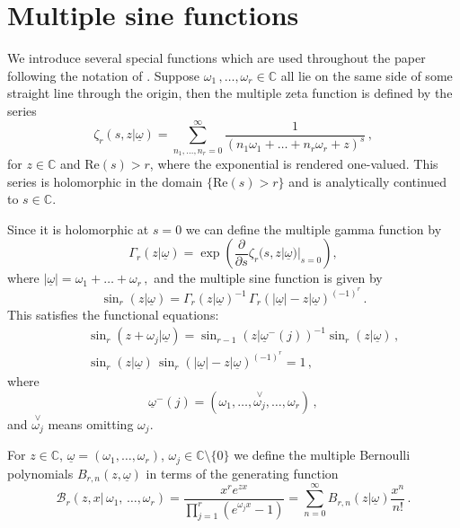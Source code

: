 \documentclass[a4paper,12pt,justification=centering]{article}
\numberwithin{equation}{section}
\theoremstyle{plain}%
\theoremstyle{definition}
\begin{document}
\begin{appendix}\label{appendix}

\section{Multiple sine functions}\label{specialfunctapp}
We introduce several special functions which are used throughout the paper following the notation of \cite{Narukawa}.  Suppose $\omega_1\,,\dots,\omega_r \in \mathbb{C}$ all lie on the same side of some straight line through the origin, then the multiple zeta function is defined by the series
\begin{equation}
\zeta_r(s,z|\underline{\omega}) = \sum_{n_1,\dots,n_r=0}^{\infty} \frac{1}{(n_1\omega_1+\dots+ n_r \omega_r +z)^s}\,,
\end{equation}
for $z\in \mathbb{C}$ and $\textrm{Re}(s) >r$, where the exponential is rendered one-valued. This series is holomorphic in the domain $\{ \textrm{Re} (s)>r\}$ and is analytically continued to $s\in \mathbb{C}$. 

Since it is holomorphic at $s=0$ we can define the multiple gamma function by
\begin{equation}
\Gamma_r(z | \underline{\omega}) =\exp \left( \frac{\partial}{\partial s} \zeta_r(s,z | \underline{\omega})|_{s=0} \right),
\end{equation}
where
$ |\underline{\omega}| = \omega_1 + \dots + \omega_r\,, $
and the multiple sine function is given by
\begin{equation}
\sin_r(z|\underline{\omega}) = \Gamma_r(z|\underline{\omega})^{-1}\, \Gamma_r(|\underline{\omega}| -  z | \underline{\omega})^{(-1)^r}\,.
\end{equation}
This satisfies the functional equations:
\begin{eqnarray}\label{eq:sinefunc}
&&\sin_r(z+\omega_j | \underline{\omega}) =\sin_{r-1} (z | \underline{\omega}^{-}(j))^{-1} \sin_r (z|\underline{\omega}) \, , \\
&&\sin_r(z| \underline{\omega}) \,\sin_r(|\underline{\omega}|-z | \underline{\omega})^{(-1)^r}=1\,,
\end{eqnarray}
where $$ \underline{\omega}^{-}(j)= (\omega_1, \dots,\overset{\vee}{\omega_j},\dots,\omega_r)\,,$$
and $\overset{\vee}{\omega_j}$ means omitting $\omega_j$.

For $z\in \mathbb{C}$, $\underline{\omega}=(\omega_1,\dots,\omega_r)$, $\omega_j \in \mathbb{C}\setminus\{0\}$ we define the multiple Bernoulli polynomials $B_{r,n}(z,\underline{\omega})$ in terms of the generating function
\begin{equation}\label{eq:Bernoullipolgen}
\mathcal{B}_r(z,x|\, \omega_1,\,\dots,\omega_r) = \frac{x^r e^{z x}}{\prod_{j=1}^r (e^{\omega_j x}-1)} = \sum_{n=0}^{\infty} B_{r,n}(z|\underline{\omega}) \frac{x^n}{n!}\,.
\end{equation}


\end{appendix}
\end{document}

